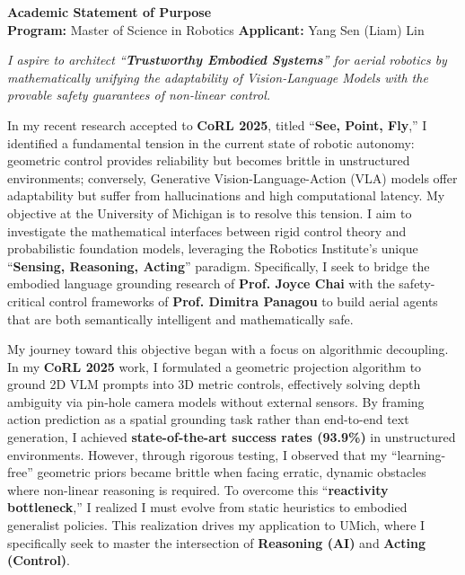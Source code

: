 \documentclass[11pt]{article}
\begin{document}
\begin{center}
    {\Large \textbf{Academic Statement of Purpose}} \\
    \vspace{1em}
    \textbf{Program:} Master of Science in Robotics \hfill \textbf{Applicant:} Yang Sen (Liam) Lin
\end{center}
\vspace{1em}


\emph{I aspire to architect ``\textbf{Trustworthy Embodied Systems}'' for aerial robotics by mathematically unifying the adaptability of Vision-Language Models with the provable safety guarantees of non-linear control.}

In my recent research accepted to \textbf{CoRL 2025}, titled ``\textbf{See, Point, Fly},'' I identified a fundamental tension in the current state of robotic autonomy: geometric control provides reliability but becomes brittle in unstructured environments; conversely, Generative Vision-Language-Action (VLA) models offer adaptability but suffer from hallucinations and high computational latency. My objective at the University of Michigan is to resolve this tension. I aim to investigate the mathematical interfaces between rigid control theory and probabilistic foundation models, leveraging the Robotics Institute’s unique ``\textbf{Sensing, Reasoning, Acting}'' paradigm. Specifically, I seek to bridge the embodied language grounding research of \textbf{Prof. Joyce Chai} with the safety-critical control frameworks of \textbf{Prof. Dimitra Panagou} to build aerial agents that are both semantically intelligent and mathematically safe.

My journey toward this objective began with a focus on algorithmic decoupling. In my \textbf{CoRL 2025} work, I formulated a geometric projection algorithm to ground 2D VLM prompts into 3D metric controls, effectively solving depth ambiguity via pin-hole camera models without external sensors. By framing action prediction as a spatial grounding task rather than end-to-end text generation, I achieved \textbf{state-of-the-art success rates (93.9\%)} in unstructured environments. However, through rigorous testing, I observed that my ``learning-free'' geometric priors became brittle when facing erratic, dynamic obstacles where non-linear reasoning is required. To overcome this ``\textbf{reactivity bottleneck},'' I realized I must evolve from static heuristics to embodied generalist policies. This realization drives my application to UMich, where I specifically seek to master the intersection of \textbf{Reasoning (AI)} and \textbf{Acting (Control)}.
\end{document}
